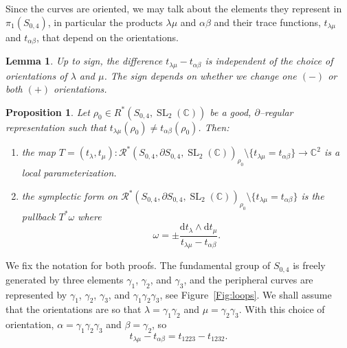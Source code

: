 \documentclass[11pt]{article}
\newtheorem{lemm}[theo]{Lemma}
\newtheorem{prop}[theo]{Proposition}
\theoremstyle{definition}
\numberwithin{equation}{section}
\numberwithin{figure}{section}
\numberwithin{table}{section}
\DeclareMathOperator{\SL}{SL}
\newcommand{\Rcal}{\mathcal{R}}
\newcommand{\Cbb}{\mathbb{C}}
\newcommand*{\dd}{\mathrm{d}}
\begin{document}
Since the curves are oriented, we may talk about the elements they represent in $\pi_1(S_{0,4})$, in particular the products $\lambda\mu$ and $\alpha\beta$ and their trace functions, $t_{\lambda\mu}$ and $t_{\alpha\beta}$, that depend on the orientations.

\begin{lemm}\label{lemma:difindep}
Up to sign, the difference $t_{\lambda\mu}-t_{\alpha\beta}$ is independent of the choice of orientations of $\lambda$ and $\mu$. The sign depends on whether we change one $(-)$ or both $(+)$ orientations.
\end{lemm}

\goodbreak

\begin{prop}\label{Prop:symplectic40}
Let $\rho_0 \in R^*(S_{0,4}, \SL_2(\Cbb))$ be a good, $\partial$--regular representation such that $t_{\lambda\mu}(\rho_0)\neq t_{\alpha\beta}(\rho_0)$. Then:
\begin{enumerate}
\item \label{list-6.5.1}
the map $T=(t_\lambda,t_\mu)\colon \Rcal^*(S_{0,4},\partial S_{0,4}, \SL_2(\Cbb))_{\rho_0}\setminus\{t_{\lambda\mu}=t_{\alpha\beta}\} \to \Cbb^2 $ is a local parameterization.
\item\label{list-6.5.2}
the symplectic form on $\Rcal^*(S_{0,4},\partial S_{0,4}, \SL_2(\Cbb))_{\rho_0}\setminus\{t_{\lambda\mu}=t_{\alpha\beta}\}$ is the pullback $T^*\omega$ where
\[
\omega = \pm \frac{\dd t_\lambda\wedge \dd t_\mu}{ t_{\lambda\mu}-t_{\alpha\beta} }.
\]
\end{enumerate}
\end{prop}


We fix the notation for both proofs. The fundamental group of $S_{0,4}$ is freely generated by three elements $\gamma_1$, $\gamma_2$, and $\gamma_3$, and the peripheral curves are represented by $\gamma_1$, $\gamma_2$, $\gamma_3$, and $\gamma_1\gamma_2\gamma_3$, see Figure~\ref{Fig:loops}. We shall assume that the orientations are so that $\lambda=\gamma_1\gamma_2$ and $\mu=\gamma_2\gamma_3$. With this choice of orientation, $\alpha= \gamma_1\gamma_2\gamma_3$ and $\beta=\gamma_2$, so
\[
t_{\lambda\mu}-t_{\alpha\beta}= t_{1223}-t_{1232}.
\]
\end{document}
